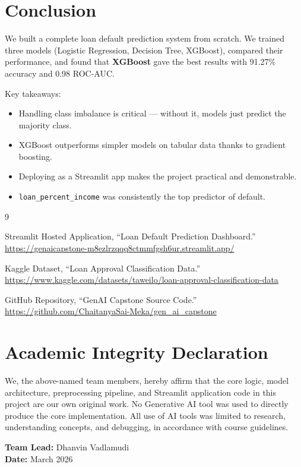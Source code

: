 \documentclass[12pt, a4paper]{article}
\begin{document}
\section{Conclusion}

We built a complete loan default prediction system from scratch. We trained three models (Logistic Regression, Decision Tree, XGBoost), compared their performance, and found that \textbf{XGBoost} gave the best results with 91.27\% accuracy and 0.98 ROC-AUC.

Key takeaways:
\begin{itemize}[leftmargin=2cm]
  \item Handling class imbalance is critical --- without it, models just predict the majority class.
  \item XGBoost outperforms simpler models on tabular data thanks to gradient boosting.
  \item Deploying as a Streamlit app makes the project practical and demonstrable.
  \item \texttt{loan\_percent\_income} was consistently the top predictor of default.
\end{itemize}

\begin{thebibliography}{9}

Streamlit Hosted Application, ``Loan Default Prediction Dashboard.'' \\
\url{https://genaicapstone-m8ezlrzqqq8ctmmfgsh6ur.streamlit.app/}

Kaggle Dataset, ``Loan Approval Classification Data.'' \\
\url{https://www.kaggle.com/datasets/taweilo/loan-approval-classification-data}

GitHub Repository, ``GenAI Capstone Source Code.'' \\
\url{https://github.com/ChaitanyaSai-Meka/gen_ai_capstone}

\end{thebibliography}

\section*{Academic Integrity Declaration}

We, the above-named team members, hereby affirm that the core logic, model architecture, preprocessing pipeline, and Streamlit application code in this project are our own original work. No Generative AI tool was used to directly produce the core implementation. All use of AI tools was limited to research, understanding concepts, and debugging, in accordance with course guidelines.

\vspace{1cm}

\noindent
\textbf{Team Lead:} Dhanvin Vadlamudi \\
\textbf{Date:} March 2026
\end{document}

